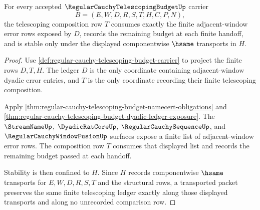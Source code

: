 \begin{theorem}
\label{thm:regular-cauchy-telescoping-budget-telescoping-composition}
For every accepted $\RegularCauchyTelescopingBudgetUp$ carrier
$$
B=(E,W,D,R,S,T,H,C,P,N),
$$
the telescoping composition row $T$ consumes exactly the finite adjacent-window error rows exposed by $D$, records the remaining budget at each finite handoff, and is stable only under the displayed componentwise $\hsame$ transports in $H$.
\end{theorem}
\begin{proof}
Use \autoref{def:regular-cauchy-telescoping-budget-carrier} to project the finite rows $D,T,H$. The ledger $D$ is the only coordinate containing adjacent-window dyadic error entries, and $T$ is the only coordinate recording their finite telescoping composition.

Apply \autoref{thm:regular-cauchy-telescoping-budget-namecert-obligations} and \autoref{thm:regular-cauchy-telescoping-budget-dyadic-ledger-exposure}. The $\StreamNameUp$, $\DyadicRatCoreUp$, $\RegularCauchySequenceUp$, and $\RegularCauchyWindowFusionUp$ surfaces expose a finite list of adjacent-window error rows. The composition row $T$ consumes that displayed list and records the remaining budget passed at each handoff.

Stability is then confined to $H$. Since $H$ records componentwise $\hsame$ transports for $E,W,D,R,S,T$ and the structural rows, a transported packet preserves the same finite telescoping ledger exactly along those displayed transports and along no unrecorded comparison row.
\end{proof}

